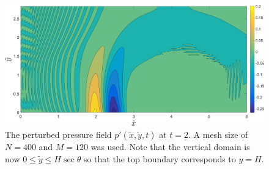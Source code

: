 \documentclass[11pt]{article}
\begin{document}
\begin{figure}[h!]
  \centering
  \includegraphics[width=\textwidth]{pp_q4_contourf.png}
  \caption{The perturbed pressure field $p'(\tilde{x},\tilde{y},t)$ at $t=2$. A mesh size of $N=400$ and $M=120$ was used. Note that the vertical domain is now $0 \le \tilde{y} \le H\sec\theta$ so that the top boundary corresponds to $y=H$.}
  \label{fig:pp_q4_contourf}
\end{figure}
\end{document}
